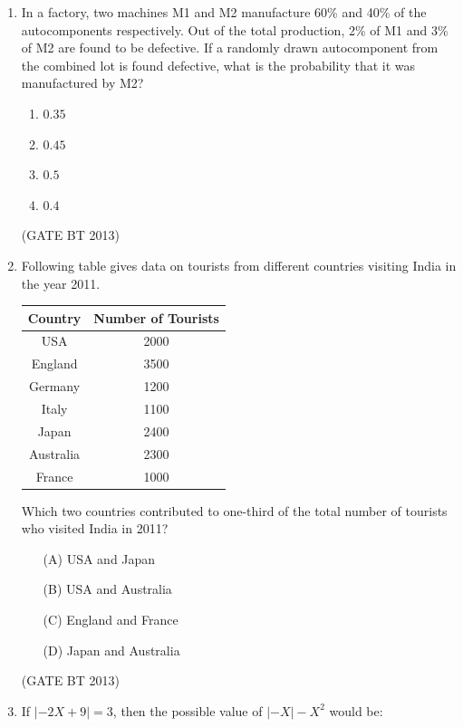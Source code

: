 \documentclass[journal,12pt,onecolumn]{IEEEtran}
\theoremstyle{remark}
\begin{document}
\begin{enumerate}
\item 

In a factory, two machines M1 and M2 manufacture 60\% and 40\% of the autocomponents respectively. Out of the total production, 2\% of M1 and 3\% of M2 are found to be defective. If a randomly drawn autocomponent from the combined lot is found defective, what is the probability that it was manufactured by M2?

\begin{enumerate}
    \item $0.35$
    \item $0.45$
    \item $0.5$
    \item $0.4$
\end{enumerate} \hfill(GATE BT 2013)

\item 
Following table gives data on tourists from different countries visiting India in the year 2011.

\begin{center}
\begin{tabular}{|c|c|}
\hline
\textbf{Country} & \textbf{Number of Tourists} \\
\hline
USA & 2000 \\
England & 3500 \\
Germany & 1200 \\
Italy & 1100 \\
Japan & 2400 \\
Australia & 2300 \\
France & 1000 \\
\hline
\end{tabular}
\end{center}

Which two countries contributed to one-third of the total number of tourists who visited India in 2011?

\begin{enumerate}
    \item[(A)] USA and Japan
    \item[(B)] USA and Australia
    \item[(C)] England and France
    \item[(D)] Japan and Australia
\end{enumerate} \hfill(GATE BT 2013)

\item 

If \(\left| -2X + 9 \right| = 3\), then the possible value of \(\left| -X \right| - X^2\) would be:


\end{enumerate}
\end{document}
